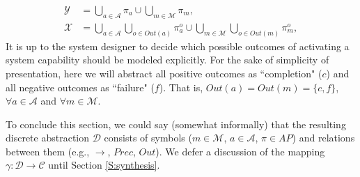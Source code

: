 \begin{subequations}
	\label{ActOutAP}
	\begin{align}
		\mathcal{Y} &= \bigcup \limits_{a \in \mathcal{A}} \pi_a \cup \bigcup \limits_{m \in \mathcal{M}} \pi_m,\\
		\mathcal{X} &= 
		\bigcup \limits_{a \in \mathcal{A}} \bigcup \limits_{o \in Out(a)} \pi_a^o \cup \bigcup \limits_{m \in \mathcal{M}} \bigcup \limits_{o \in Out(m)} \pi_m^o,
	\end{align}
\end{subequations}
It is up to the system designer to decide which possible outcomes of activating a system capability should be modeled explicitly.
For the sake of simplicity of presentation, here we will abstract all positive outcomes as ``completion" ($c$) and all negative outcomes as ``failure" ($f$). 
That is, $Out(a) = Out(m) = \{ c, f \}$, $\forall a \in \mathcal{A}$ and $\forall m \in \mathcal{M}$.

To conclude this section, we could say (somewhat informally) that the resulting discrete abstraction $\mathcal{D}$ consists of symbols ($m \in \mathcal{M}$, $a \in \mathcal{A}$, $\pi \in AP$) and relations between them (e.g., $\boldsymbol\rightarrow$, $Prec$, $Out$).
We defer a discussion of the mapping $\gamma: \mathcal{D} \rightarrow \mathcal{C}$ until Section \ref{S:synthesis}.

%

